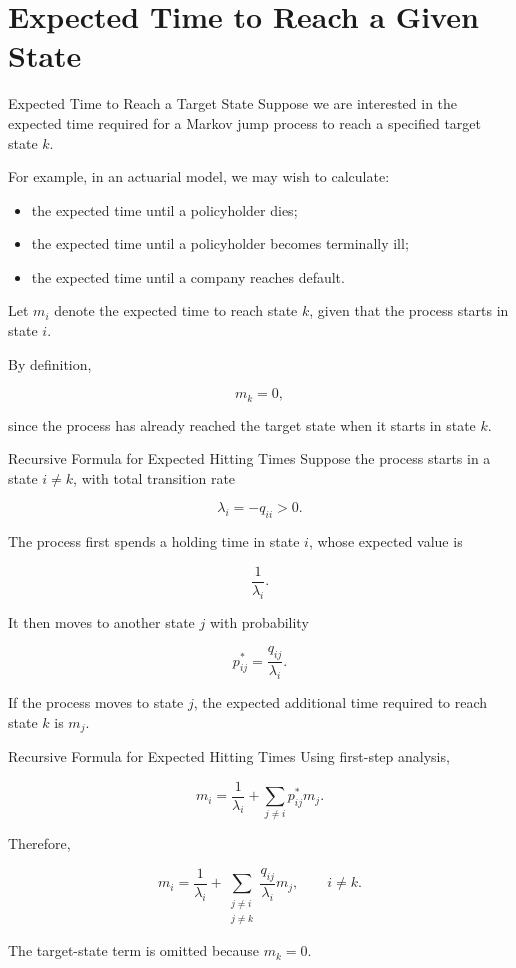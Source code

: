 \documentclass[
  ignorenonframetext,
  aspectratio=169,
]{beamer}
\providecommand{\tightlist}{%
  \setlength{\itemsep}{0pt}\setlength{\parskip}{0pt}}
\begin{document}
\section{Expected Time to Reach a Given
State}\label{expected-time-to-reach-a-given-state}

\begin{frame}{Expected Time to Reach a Target State}
\protect{}\label{expected-time-to-reach-a-target-state}
Suppose we are interested in the expected time required for a Markov
jump process to reach a specified target state \(k\).

For example, in an actuarial model, we may wish to calculate:

\begin{itemize}
\tightlist
\item
  the expected time until a policyholder dies;
\item
  the expected time until a policyholder becomes terminally ill;
\item
  the expected time until a company reaches default.
\end{itemize}

Let \(m_i\) denote the expected time to reach state \(k\), given that
the process starts in state \(i\).

By definition,

\[
m_k=0,
\]

since the process has already reached the target state when it starts in
state \(k\).
\end{frame}

\begin{frame}{Recursive Formula for Expected Hitting Times}
\protect{}\label{recursive-formula-for-expected-hitting-times}
Suppose the process starts in a state \(i\neq k\), with total transition
rate

\[
\lambda_i=-q_{ii}>0.
\]

The process first spends a holding time in state \(i\), whose expected
value is

\[
\frac{1}{\lambda_i}.
\]

It then moves to another state \(j\) with probability

\[
p_{ij}^*=\frac{q_{ij}}{\lambda_i}.
\]

If the process moves to state \(j\), the expected additional time
required to reach state \(k\) is \(m_j\).
\end{frame}

\begin{frame}{Recursive Formula for Expected Hitting Times}
\protect{}\label{recursive-formula-for-expected-hitting-times-1}
Using first-step analysis,

\[
m_i
=
\frac{1}{\lambda_i}
+
\sum_{j\neq i}p_{ij}^*m_j.
\]

Therefore,

\[
\boxed{
m_i
=
\frac{1}{\lambda_i}
+
\sum_{\substack{j\neq i\\j\neq k}}
\frac{q_{ij}}{\lambda_i}m_j,
\qquad i\neq k.
}
\]

The target-state term is omitted because \(m_k=0\).
\end{frame}
\end{document}

